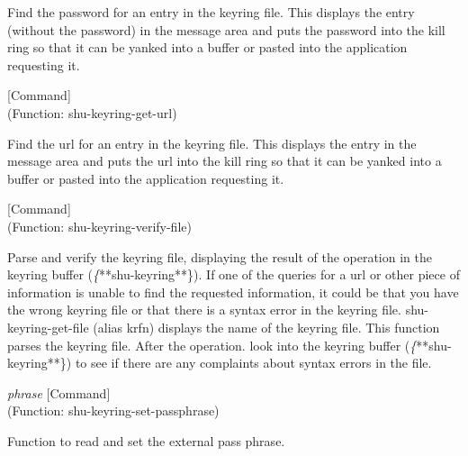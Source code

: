 \begin{doc-string}
Find the password for an entry in the keyring file.  This displays the entry
(without the password) in the message area and puts the password into the kill
ring so that it can be yanked into a buffer or pasted into the application
requesting it.
\end{doc-string}

\vspace{1em}
\noindent
{}
\usebox{\funcname}
 \hfill [Command]\\%
 (Function: shu-keyring-get-url)

\begin{doc-string}
Find the url for an entry in the keyring file.  This displays the entry in
the message area and puts the url into the kill ring so that it can be yanked
into a buffer or pasted into the application requesting it.
\end{doc-string}

\vspace{1em}
\noindent
{}
\usebox{\funcname}
 \hfill [Command]\\%
 (Function: shu-keyring-verify-file)

\begin{doc-string}
Parse and verify the keyring file, displaying the result of the operation in the
keyring buffer (\emph\{**shu-keyring**\}).  If one of the queries for a url or other
piece of information is unable to find the requested information, it could be
that you have the wrong keyring file or that there is a syntax error in the
keyring file.  shu-keyring-get-file (alias krfn) displays the name of the
keyring file.  This function parses the keyring file.  After the operation. look
into the keyring buffer (\emph\{**shu-keyring**\}) to see if there are any complaints
about syntax errors in the file.
\end{doc-string}

\vspace{1em}
\noindent
{}
\usebox{\funcname}\emph{phrase}
 \hfill [Command]\\%
 (Function: shu-keyring-set-passphrase)

\begin{doc-string}
Function to read and set the external pass phrase.
\end{doc-string}

